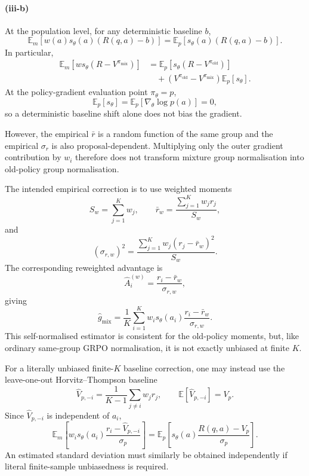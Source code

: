 \documentclass[11pt]{article}
\begin{document}
\paragraph{(iii-b)}
At the population level, for any deterministic baseline $b$,
\[
\mathbb{E}_{m}
\left[
w(a)s_\theta(a)(R(q,a)-b)
\right]
=
\mathbb{E}_{p}
\left[
s_\theta(a)(R(q,a)-b)
\right].
\]
In particular,
\begin{align*}
\mathbb{E}_{m}
\left[
w s_\theta(R-V^{\pi_{\mathrm{mix}}})
\right]
&=
\mathbb{E}_{p}
\left[
s_\theta(R-V^{\pi_{\mathrm{old}}})
\right]\\
&\quad+
\left(
V^{\pi_{\mathrm{old}}}
-
V^{\pi_{\mathrm{mix}}}
\right)
\mathbb{E}_{p}[s_\theta].
\end{align*}
At the policy-gradient evaluation point $\pi_\theta=p$,
\[
\mathbb{E}_{p}[s_\theta]
=
\mathbb{E}_{p}[\nabla_\theta\log p(a)]
=0,
\]
so a deterministic baseline shift alone does not bias the gradient.

However, the empirical $\bar r$ is a random function of the same group and the
empirical $\sigma_r$ is also proposal-dependent. Multiplying only the outer
gradient contribution by $w_i$ therefore does not transform mixture group
normalisation into old-policy group normalisation.

The intended empirical correction is to use weighted moments
\[
S_w=\sum_{j=1}^K w_j,
\qquad
\bar r_w
=
\frac{\sum_{j=1}^K w_jr_j}{S_w},
\]
and
\[
(\sigma_{r,w})^2
=
\frac{
\sum_{j=1}^K w_j(r_j-\bar r_w)^2
}{
S_w
}.
\]
The corresponding reweighted advantage is
\[
\boxed{
\hat A_i^{(w)}
=
\frac{r_i-\bar r_w}{\sigma_{r,w}},
}
\]
giving
\[
\boxed{
\hat g_{\mathrm{mix}}
=
\frac{1}{K}
\sum_{i=1}^K
w_i s_\theta(a_i)
\frac{r_i-\bar r_w}{\sigma_{r,w}}.
}
\]
This self-normalised estimator is consistent for the old-policy moments, but,
like ordinary same-group GRPO normalisation, it is not exactly unbiased at
finite $K$.

For a literally unbiased finite-$K$ baseline correction, one may instead use
the leave-one-out Horvitz--Thompson baseline
\[
\hat V_{p,-i}
=
\frac{1}{K-1}
\sum_{j\neq i}w_jr_j,
\qquad
\mathbb{E}[\hat V_{p,-i}]=V_p.
\]
Since $\hat V_{p,-i}$ is independent of $a_i$,
\[
\mathbb{E}_{m}
\left[
w_i s_\theta(a_i)
\frac{r_i-\hat V_{p,-i}}{\sigma_p}
\right]
=
\mathbb{E}_{p}
\left[
s_\theta(a)
\frac{R(q,a)-V_p}{\sigma_p}
\right].
\]
An estimated standard deviation must similarly be obtained independently if
literal finite-sample unbiasedness is required.
\end{document}
